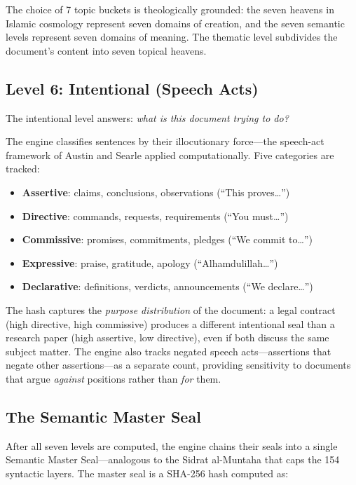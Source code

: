 \documentclass[11pt,a4paper]{article}
\begin{document}
The choice of 7 topic buckets is theologically grounded: the seven heavens in Islamic cosmology represent seven domains of creation, and the seven semantic levels represent seven domains of meaning. The thematic level subdivides the document's content into seven topical heavens.

\subsection{Level 6: Intentional (Speech Acts)}

The intentional level answers: \textit{what is this document trying to do?}

The engine classifies sentences by their illocutionary force---the speech-act framework of Austin and Searle applied computationally. Five categories are tracked:

\begin{itemize}[nosep]
    \item \textbf{Assertive}: claims, conclusions, observations (``This proves\ldots'')
    \item \textbf{Directive}: commands, requests, requirements (``You must\ldots'')
    \item \textbf{Commissive}: promises, commitments, pledges (``We commit to\ldots'')
    \item \textbf{Expressive}: praise, gratitude, apology (``Alhamdulillah\ldots'')
    \item \textbf{Declarative}: definitions, verdicts, announcements (``We declare\ldots'')
\end{itemize}

The hash captures the \textit{purpose distribution} of the document: a legal contract (high directive, high commissive) produces a different intentional seal than a research paper (high assertive, low directive), even if both discuss the same subject matter. The engine also tracks negated speech acts---assertions that negate other assertions---as a separate count, providing sensitivity to documents that argue \textit{against} positions rather than \textit{for} them.

\subsection{The Semantic Master Seal}

After all seven levels are computed, the engine chains their seals into a single Semantic Master Seal---analogous to the Sidrat al-Muntaha that caps the 154 syntactic layers. The master seal is a SHA-256 hash computed as:
\end{document}
